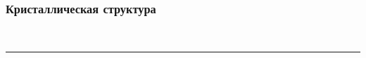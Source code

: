 \begin{frame}
	\frametitle{Кристаллическая структура}
	\centering
	\begin{minipage}[t]{0.25\linewidth}
	\end{minipage}
	\begin{minipage}[t]{0.25\linewidth}
	\end{minipage}
	\\
	\begin{minipage}[t]{0.15\linewidth}
	\end{minipage}
	\begin{minipage}[t]{0.15\linewidth}
	\end{minipage}
	\begin{minipage}[t]{0.15\linewidth}
	\end{minipage}
	\begin{minipage}[t]{0.15\linewidth}
	\end{minipage}
	\begin{minipage}[t]{0.15\linewidth}
	\end{minipage}
\bigskip
\hrule{}
\bigskip
	\begin{minipage}[t]{0.25\linewidth}
\end{minipage}
\begin{minipage}[t]{0.25\linewidth}
\end{minipage}
\\
\begin{minipage}[t]{0.2\linewidth}
\end{minipage}
\begin{minipage}[t]{0.2\linewidth}
\end{minipage}
\begin{minipage}[t]{0.2\linewidth}
\end{minipage}
\end{frame}

